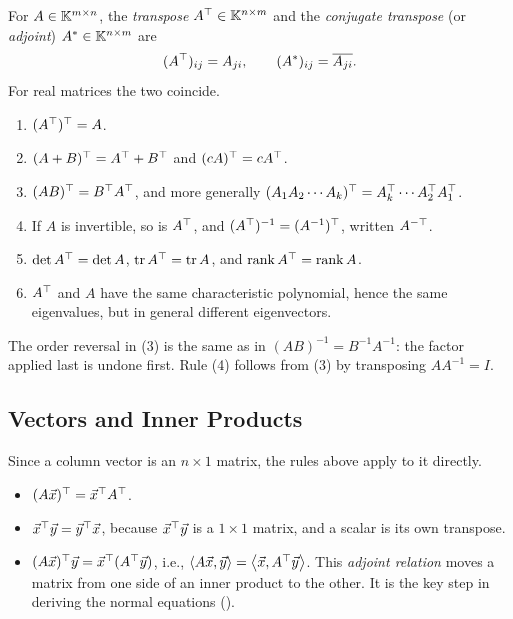\begin{definition}
  \label{def:transpose}
  For $A \in \mathbb{K}^{m \times n}$, the \emph{transpose} $A^\top \in \mathbb{K}^{n \times m}$ and the \emph{conjugate transpose} (or \emph{adjoint}) $A^\ast \in \mathbb{K}^{n \times m}$ are
  \begin{equation}
    (A^\top)_{ij} = A_{ji}, \qquad (A^\ast)_{ij} = \overline{A_{ji}}.
  \end{equation}
  For real matrices the two coincide.
\end{definition}

\begin{proposition}
  \label{prop:transpose-rules}
  \begin{enumerate}
    \item $(A^\top)^\top = A$.
    \item $(A + B)^\top = A^\top + B^\top$ and $(cA)^\top = cA^\top$.
    \item $(AB)^\top = B^\top A^\top$, and more generally $(A_1 A_2 \cdots A_k)^\top = A_k^\top \cdots A_2^\top A_1^\top$.
    \item If $A$ is invertible, so is $A^\top$, and $(A^\top)^{-1} = (A^{-1})^\top$, written $A^{-\top}$.
    \item $\det A^\top = \det A$, $\operatorname{tr} A^\top = \operatorname{tr} A$, and $\operatorname{rank} A^\top = \operatorname{rank} A$.
    \item $A^\top$ and $A$ have the same characteristic polynomial, hence the same eigenvalues, but in general different eigenvectors.
  \end{enumerate}
\end{proposition}

The order reversal in (3) is the same as in $(AB)^{-1} = B^{-1}A^{-1}$: the factor applied last is undone first. Rule (4) follows from (3) by transposing $AA^{-1} = I$.

\subsection{Vectors and Inner Products}

Since a column vector is an $n \times 1$ matrix, the rules above apply to it directly.
\begin{itemize}
  \item $(A\vec{x})^\top = \vec{x}^\top A^\top$.
  \item $\vec{x}^\top\vec{y} = \vec{y}^\top\vec{x}$, because $\vec{x}^\top\vec{y}$ is a $1 \times 1$ matrix, and a scalar is its own transpose.
  \item $(A\vec{x})^\top\vec{y} = \vec{x}^\top(A^\top\vec{y})$, i.e., $\left\langle A\vec{x}, \vec{y} \right\rangle = \left\langle \vec{x}, A^\top\vec{y} \right\rangle$. This \emph{adjoint relation} moves a matrix from one side of an inner product to the other. It is the key step in deriving the normal equations ().
\end{itemize}

